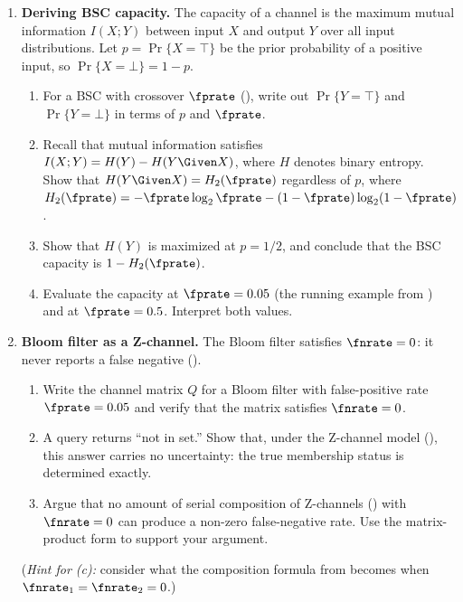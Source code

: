\begin{enumerate}

\item \exstarstar
\label{ex:bsc-capacity}
\textbf{Deriving BSC capacity.}
The capacity of a channel is the maximum mutual information $I(X;Y)$
between input $X$ and output $Y$ over all input distributions.
Let $p = \Pr\{X = \top\}$ be the prior probability of a positive input,
so $\Pr\{X = \bot\} = 1 - p$.
\begin{enumerate}
  \item[(a)] For a BSC with crossover $\fprate$ (), write out
    $\Pr\{Y = \top\}$ and $\Pr\{Y = \bot\}$ in terms of $p$ and $\fprate$.
  \item[(b)] Recall that mutual information satisfies
    $I(X;Y) = H(Y) - H(Y \Given X)$, where $H$ denotes binary entropy.
    Show that $H(Y \Given X) = H_2(\fprate)$ regardless of $p$, where
    $H_2(\fprate) = -\fprate \log_2 \fprate - (1-\fprate)\log_2(1-\fprate)$.
  \item[(c)] Show that $H(Y)$ is maximized at $p = 1/2$, and conclude
    that the BSC capacity is $1 - H_2(\fprate)$.
  \item[(d)] Evaluate the capacity at $\fprate = 0.05$ (the running example
    from ) and at $\fprate = 0.5$. Interpret both values.
\end{enumerate}

\item \exstarstar
\textbf{Bloom filter as a Z-channel.}
The Bloom filter satisfies $\fnrate = 0$: it never reports a false negative
().
\begin{enumerate}
  \item[(a)] Write the channel matrix $Q$ for a Bloom filter with false-positive
    rate $\fprate = 0.05$ and verify that the matrix satisfies $\fnrate = 0$.
  \item[(b)] A query returns ``not in set.'' Show that, under the Z-channel model
    (), this answer carries no uncertainty: the
    true membership status is determined exactly.
  \item[(c)] Argue that no amount of serial composition of Z-channels
    () with $\fnrate = 0$ can produce a non-zero
    false-negative rate. Use the matrix-product form to support your argument.
\end{enumerate}
(\textit{Hint for (c):} consider what the composition formula from
 becomes when $\fnrate_1 = \fnrate_2 = 0$.)


\end{enumerate}
